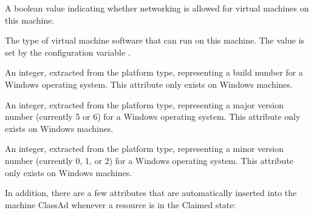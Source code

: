 \begin{description}
%
\item[\AdAttr{VM\_Networking}:] A boolean value indicating whether networking 
is allowed for virtual machines on this machine.
%
\item[\AdAttr{VM\_Type}:] The type of virtual machine software that can run
on this machine.  The value is set by the configuration variable
.
%
\item[\AdAttr{WindowsBuildNumber}:] An integer, extracted from the
platform type, representing a build number 
for a Windows operating system.
This attribute only exists on Windows machines.
%
\item[\AdAttr{WindowsMajorVersion}:] An integer, extracted from the
platform type, representing a major version number (currently 5 or 6)
for a Windows operating system.
This attribute only exists on Windows machines.
%
\item[\AdAttr{WindowsMinorVersion}:] An integer, extracted from the
platform type, representing a minor version number (currently 0, 1, or 2)
for a Windows operating system.
This attribute only exists on Windows machines.

\end{description}

In addition, there are a few attributes that are automatically
inserted into the machine ClassAd whenever a resource is in the
Claimed state:

